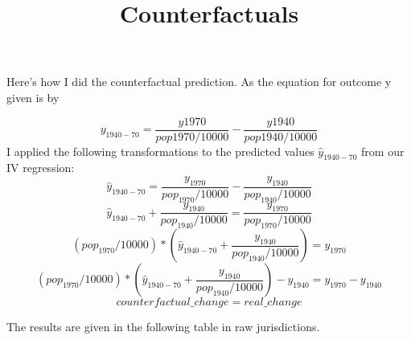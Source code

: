 \documentclass{article}
\title{Counterfactuals}
\begin{document}
\maketitle

{\footnotesize }



Here's how I did the counterfactual prediction. As the equation for outcome y given is by

\[
 y_{1940-70} = \frac{y1970}{pop1970/10000} - \frac{y1940}{pop1940/10000}
\]
I applied the following transformations to the predicted values $\hat y_{1940-70}$ from our IV regression:
\[
	\hat y_{1940-70} =  \frac{y_{1970}}{pop_{1970}/10000} - \frac{y_{1940}}{pop_{1940}/10000}
\]
\[
	\hat y_{1940-70} +  \frac{y_{1940}}{pop_{1940}/10000} =  \frac{y_{1970}}{pop_{1970}/10000} 
\]
\[
	(pop_{1970}/10000) *(\hat y_{1940-70} +  \frac{y_{1940}}{pop_{1940}/10000}) = y_{1970} 
\]
\[
	(pop_{1970}/10000) *(\hat y_{1940-70} +  \frac{y_{1940}}{pop_{1940}/10000})  - y_{1940} = y_{1970} - y_{1940}
\]
\[
counterfactual\_change = real\_change
\]

The results are given in the following table in raw jurisdictions.


\centering

\end{document}
